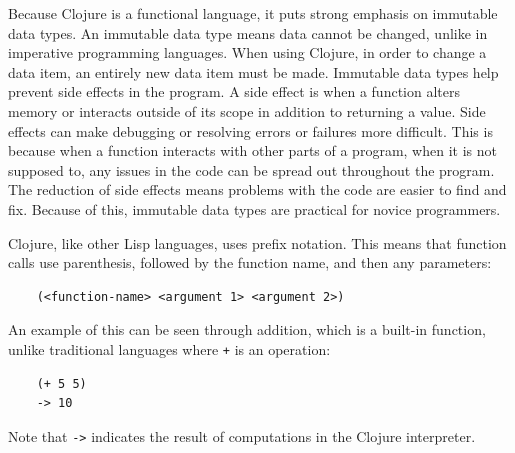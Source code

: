 \documentclass[12pt]{article}
\newcommand{\comment}[1]{{\bf \tt  {#1}}}
\newcommand{\emcomment}[1]{\textcolor{ForestGreen}{\comment{Elena: {#1}}}}
\newcommand{\hfcomment}[1]{\textcolor{Teal}{\comment{Henry: {#1}}}}
\begin{document}
Because Clojure is a functional language, it puts strong emphasis on
immutable data types. An immutable data type means data cannot 
be changed, unlike in %
imperative programming languages. When using Clojure, in order to change a data item, an entirely 
new data item must be made. Immutable data types help prevent side effects in the program. 
A side effect is when a function alters memory or interacts outside of its scope in addition to 
returning a value. Side effects can make debugging or resolving errors or failures more
difficult. This is because when a function interacts with other parts of a program,
when it is not supposed to, any issues in the code can be spread out throughout the program. The
reduction of side effects means problems with the code are easier to find and fix.
Because of this, immutable data types are practical for novice programmers.
 
Clojure, like other Lisp languages, uses prefix notation. This means
that function calls use parenthesis, followed by the function name,
and then any parameters: 
\begin{verbatim}
	(<function-name> <argument 1> <argument 2>)
\end{verbatim}

An example of this can be seen through addition, which is a built-in function, unlike traditional
languages where \texttt{+} is an operation: %

\begin{verbatim}
	(+ 5 5)
	-> 10
\end{verbatim}

Note that \texttt{->} indicates the result of computations in the Clojure interpreter.
\end{document}
